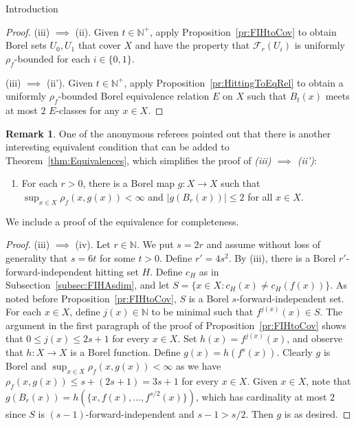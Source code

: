 \documentclass[psamsfonts]{amsart}
\theoremstyle{definition}
\newtheorem{remark}[thm]{Remark}
\newcommand{\N}{\mathbb N}
\theoremstyle{remark}
\numberwithin{equation}{section}
\newcommand\mcal{\mathcal}
\begin{document}
\begin{section}{Introduction}
\begin{proof}
    (iii) $\implies$ (ii).
    Given $t\in \N^+$, apply Proposition~\ref{pr:FIHtoCov} to obtain Borel sets $U_0, U_1$ that cover $X$ and have the property that $\mcal{F}_r(U_i)$ is uniformly $\rho_f$-bounded for each $i \in \{0, 1\}$.

    \medskip

    (iii) $\implies$ (ii').
    Given $t \in \N^+$, apply Proposition~\ref{pr:HittingToEqRel} to obtain a uniformly $\rho_f$-bounded Borel equivalence relation $E$ on $X$ such that $B_t(x)$ meets at most $2$ $E$-classes for any $x \in X$.
    \end{proof}

    \begin{remark}
    \label{rem:new condition}
    One of the anonymous referees pointed out that there is another interesting equivalent condition that can be added to Theorem~\ref{thm:Equivalences}, which simplifies the proof of \emph{(iii) $\implies$ (ii')}:
    \begin{enumerate}
        \item [(iv)] For each $r> 0$, there is a Borel map $g : X \to X$ such that $\sup_{x \in X} \rho_f(x, g(x)) < \infty$ and $\vert g(B_r(x)) \vert \leq 2$ for all $x \in X$.
    \end{enumerate}
    We include a proof of the equivalence for completeness.

    \begin{proof}
    (iii) $\implies$ (iv).
    Let $r\in \mathbb{N}$.
    We put $s=2r$ and assume without loss of generality that $s=6t$ for some $t>0$.
    Define $r'=4s^2$.
    By (iii), there is a Borel $r'$-forward-independent hitting set $H$.
    Define $c_H$ as in Subsection~\ref{subsec:FIHAsdim}, and let $S = \{x \in X : c_H(x) \neq c_H(f(x)) \}$.
    As noted before Proposition~\ref{pr:FIHtoCov}, $S$ is a Borel $s$-forward-independent set.
    For each $x\in X$, define $j(x)\in \mathbb{N}$ to be minimal such that $f^{j(x)}(x)\in S$.
    The argument in the first paragraph of the proof of Proposition~\ref{pr:FIHtoCov} shows that $0\le j(x)\le 2s+1$ for every $x \in X$.
    Set $h(x)=f^{j(x)}(x)$, and observe that $h:X\to X$ is a Borel function.
    Define $g(x) = h(f^s(x))$.
    Clearly $g$ is Borel and $\sup_{x \in X} \rho_f(x, g(x)) < \infty$ as we have $\rho_f(x, g(x)) \leq s + (2s + 1) = 3s + 1$ for every $x\in X$.
    Given $x\in X$, note that $g(B_r(x)) = h(\{x, f(x), \dots, f^{s/2}(x) \})$, which has cardinality at most $2$ since $S$ is $(s - 1)$-forward-independent and $s - 1 > s/2$.
    Then $g$ is as desired.
    

\end{proof}
\end{remark}
\end{section}
\end{document}
